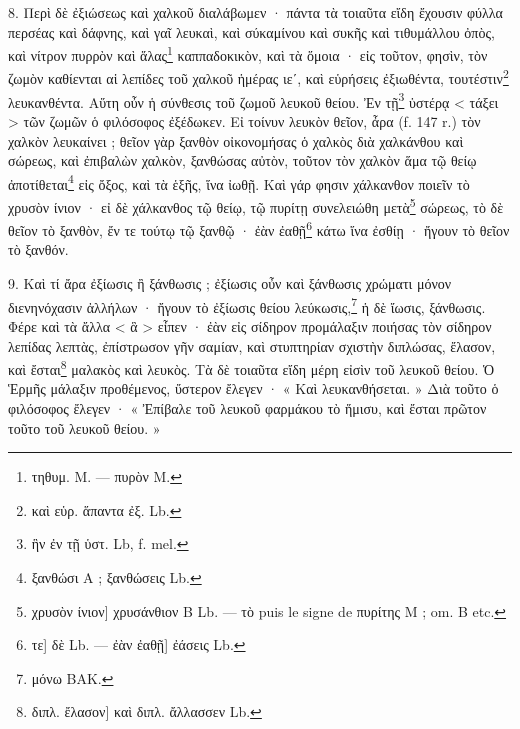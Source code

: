 \documentclass[landscape, a4paper, 11pt, oneside, polutonikogreek, french]{article}
\begin{document}
8. Περὶ δὲ ἐξιώσεως καὶ χαλκοῦ διαλάβωμεν · πάντα τὰ τοιαῦτα εἴδη ἔχουσιν φύλλα περσέας καὶ δάφνης, καὶ γαῖ λευκαὶ, καὶ σύκαμίνου καὶ συκῆς καὶ τιθυμάλλου ὀπὸς, καὶ νίτρον πυρρὸν καὶ ἅλας\footnote{τηθυμ. M. --- πυρὸν M.} καππαδοκικὸν, καὶ τὰ ὅμοια · εἰς τοῦτον, φησὶν, τὸν ζωμὸν καθίενται αἱ λεπίδες τοῦ χαλκοῦ ἡμέρας ιεʹ, καὶ εὑρήσεις ἐξιωθέντα, τουτέστιν\footnote{καὶ εὑρ. ἅπαντα ἐξ. Lb.} λευκανθέντα. Αὕτη οὖν ἡ σύνθεσις τοῦ ζωμοῦ λευκοῦ θείου. Ἐν τῇ\footnote{ἣν ἐν τῇ ὑστ. Lb, f. mel.} ὑστέρᾳ < τάξει > τῶν ζωμῶν ὁ φιλόσοφος ἐξέδωκεν. Εἰ τοίνυν λευκὸν θεῖον, ἆρα (f. 147 r.) τὸν χαλκὸν λευκαίνει ; θεῖον γὰρ ξανθὸν οἰκονομήσας ὁ χαλκὸς διὰ χαλκάνθου καὶ σώρεως, καὶ ἐπιβαλὼν χαλκὸν, ξανθώσας αὐτὸν, τοῦτον τὸν χαλκὸν ἅμα τῷ θείῳ ἀποτίθεται\footnote{ξανθώσι A ; ξανθώσεις Lb.} εἰς ὄξος, καὶ τὰ ἑξῆς, ἵνα ἰωθῇ. Καὶ γάρ φησιν χάλκανθον ποιεῖν τὸ χρυσὸν ίνιον · εἰ δὲ χάλκανθος τῷ θείῳ, τῷ πυρίτῃ συνελειώθη μετὰ\footnote{χρυσὸν ίνιον] χρυσάνθιον B Lb. --- τὸ puis le signe de πυρίτης M ; om. B etc.} σώρεως, τὸ δὲ θεῖον τὸ ξανθὸν, ἔν τε τούτῳ τῷ ξανθῷ · ἐὰν ἐαθῇ\footnote{τε] δὲ Lb. --- ἐὰν ἐαθῇ] ἐάσεις Lb.} κάτω ἵνα ἐσθίῃ · ἤγουν τὸ θεῖον τὸ ξανθόν.

9. Καὶ τί ἄρα ἐξίωσις ἢ ξάνθωσις ; ἐξίωσις οὖν καὶ ξάνθωσις χρώματι μόνον διενηνόχασιν ἀλλήλων · ἤγουν τὸ ἐξίωσις θείου λεύκωσις,\footnote{μόνω BAK.} ἡ δὲ ἴωσις, ξάνθωσις. Φέρε καὶ τὰ ἄλλα < ἃ > εἶπεν · ἐὰν εἰς σίδηρον προμάλαξιν ποιήσας τὸν σίδηρον λεπίδας λεπτὰς, ἐπίστρωσον γῆν σαμίαν, καὶ στυπτηρίαν σχιστὴν διπλώσας, ἔλασον, καὶ ἔσται\footnote{διπλ. ἔλασον] καὶ διπλ. ἄλλασσεν Lb.} μαλακὸς καὶ λευκὸς. Τὰ δὲ τοιαῦτα εἴδη μέρη εἰσὶν τοῦ λευκοῦ θείου. Ὁ Ἑρμῆς μάλαξιν προθέμενος, ὔστερον ἔλεγεν · « Καὶ λευκανθήσεται. » Διὰ τοῦτο ὁ φιλόσοφος ἔλεγεν · « Ἐπίβαλε τοῦ λευκοῦ φαρμάκου τὸ ἥμισυ, καὶ ἔσται πρῶτον τοῦτο τοῦ λευκοῦ θείου. »
\end{document}

